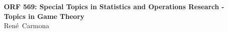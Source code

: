 \documentclass[a4paper,12pt]{article}
\theoremstyle{remark}
\theoremstyle{definition}
\numberwithin{equation}{subsection}
\begin{document}
\begin{center}
\hspace*{0.15 in} {\Large \bf ORF 569:  Special Topics in Statistics and Operations Research - Topics in Game Theory}\\
           Ren\'e\  Carmona

\end{center}

\tableofcontents


\newpage



\newpage
\newpage




\newpage



\newpage



\newpage


\newpage


\newpage


\newpage


\newpage

{}
\end{document}
